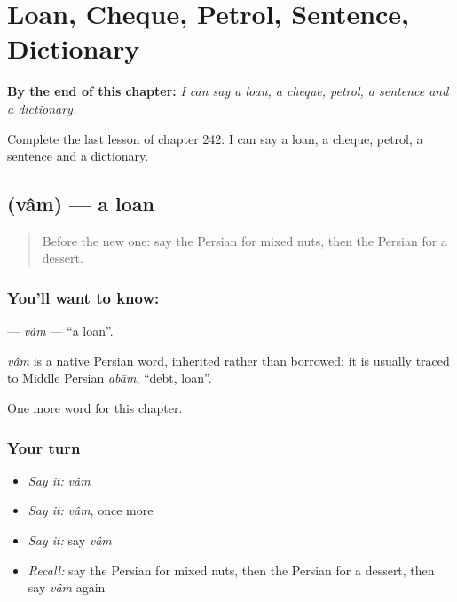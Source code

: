 
\chapter{Loan, Cheque, Petrol, Sentence, Dictionary}
\label{ch:fa-loan-cheque-petrol-sentence-dictionary}

\begin{chapteropening}
\textbf{By the end of this chapter:} \emph{I can say a loan, a cheque, petrol, a sentence and a dictionary.}

Complete the last lesson of chapter 242: I can say a loan, a cheque, petrol, a sentence and a dictionary.
\end{chapteropening}

\section[\texorpdfstring{\fa{وام} (vâm)}{وام (vâm)}]{ (vâm) — a loan}

\label{lesson:FA-C242-vam}



\begin{quote}
Before the new one: say the Persian for mixed nuts, then the Persian for a dessert.
\end{quote}

\subsection*{You'll want to know: }
\textbf{} — \emph{vâm} — \textquotedblleft{}a loan\textquotedblright{}.

\begin{cousinweb}
\emph{vâm} is a native Persian word, inherited rather than borrowed; it is usually traced to Middle Persian \emph{abām}, \textquotedblleft{}debt, loan\textquotedblright{}.
\end{cousinweb}

\begin{grammarlens}[title={What you've built}]
One more word for this chapter.
\end{grammarlens}

\subsection*{Your turn}
\begin{itemize}
\raggedright
  \item \emph{Say it:} \emph{vâm}
  \item \emph{Say it:} \emph{vâm}, once more
  \item \emph{Say it:} say \emph{vâm}
  \item \emph{Recall:} say the Persian for mixed nuts, then the Persian for a dessert, then say \emph{vâm} again
\end{itemize}

